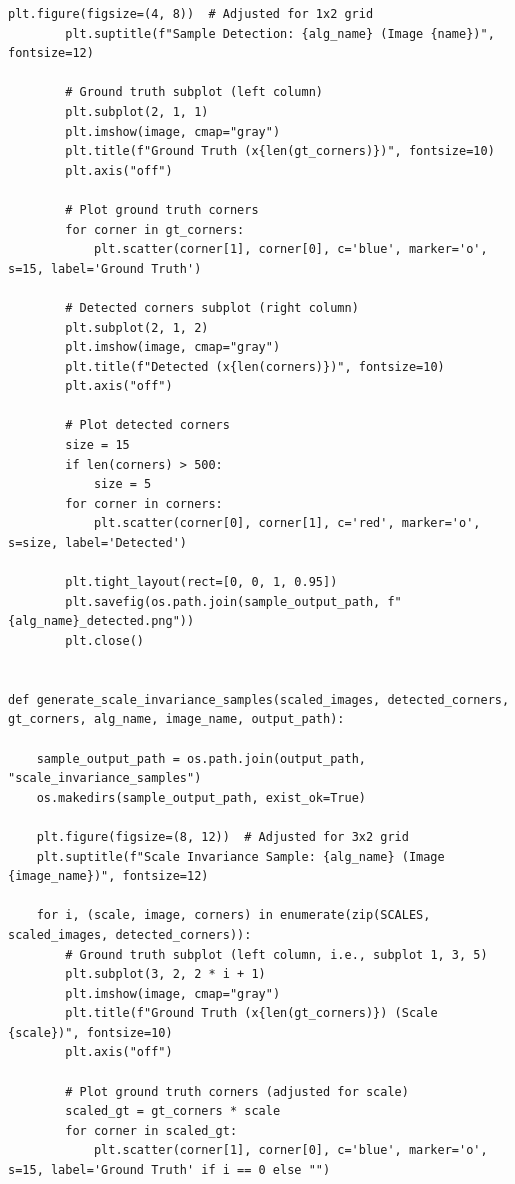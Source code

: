 \documentclass[journal]{IEEEtran}
\begin{document}
\begin{lstlisting}[style=python, caption={Utility Functions for Data Processing}, label={lst:utilities}]
        plt.figure(figsize=(4, 8))  # Adjusted for 1x2 grid
        plt.suptitle(f"Sample Detection: {alg_name} (Image {name})", fontsize=12)
        
        # Ground truth subplot (left column)
        plt.subplot(2, 1, 1)
        plt.imshow(image, cmap="gray")
        plt.title(f"Ground Truth (x{len(gt_corners)})", fontsize=10)
        plt.axis("off")
        
        # Plot ground truth corners
        for corner in gt_corners:
            plt.scatter(corner[1], corner[0], c='blue', marker='o', s=15, label='Ground Truth')
        
        # Detected corners subplot (right column)
        plt.subplot(2, 1, 2)
        plt.imshow(image, cmap="gray")
        plt.title(f"Detected (x{len(corners)})", fontsize=10)
        plt.axis("off")
        
        # Plot detected corners
        size = 15
        if len(corners) > 500:
            size = 5
        for corner in corners:
            plt.scatter(corner[0], corner[1], c='red', marker='o', s=size, label='Detected')
        
        plt.tight_layout(rect=[0, 0, 1, 0.95])
        plt.savefig(os.path.join(sample_output_path, f"{alg_name}_detected.png"))
        plt.close()
        
        
def generate_scale_invariance_samples(scaled_images, detected_corners, gt_corners, alg_name, image_name, output_path):
    
    sample_output_path = os.path.join(output_path, "scale_invariance_samples")
    os.makedirs(sample_output_path, exist_ok=True)
    
    plt.figure(figsize=(8, 12))  # Adjusted for 3x2 grid
    plt.suptitle(f"Scale Invariance Sample: {alg_name} (Image {image_name})", fontsize=12)
    
    for i, (scale, image, corners) in enumerate(zip(SCALES, scaled_images, detected_corners)):
        # Ground truth subplot (left column, i.e., subplot 1, 3, 5)
        plt.subplot(3, 2, 2 * i + 1)
        plt.imshow(image, cmap="gray")
        plt.title(f"Ground Truth (x{len(gt_corners)}) (Scale {scale})", fontsize=10)
        plt.axis("off")
        
        # Plot ground truth corners (adjusted for scale)
        scaled_gt = gt_corners * scale
        for corner in scaled_gt:
            plt.scatter(corner[1], corner[0], c='blue', marker='o', s=15, label='Ground Truth' if i == 0 else "")
        

\end{lstlisting}
\end{document}
